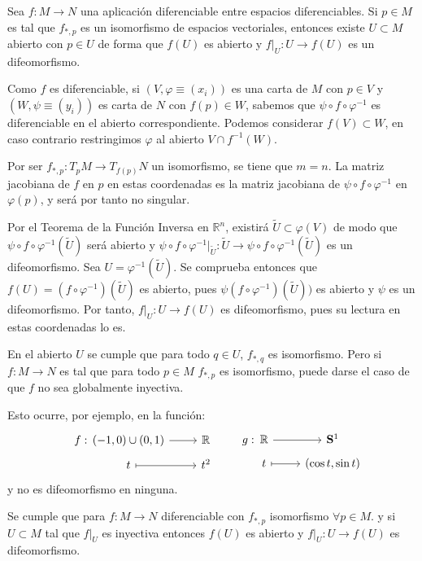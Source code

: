 \begin{teo}
Sea $f: M \to N$ una aplicación diferenciable entre espacios diferenciables. Si $p \in M$ es tal que $f_{*,p}$ es un isomorfismo de espacios vectoriales, entonces existe $U \subset M$ abierto con $p \in U$ de forma que $f(U)$ es abierto y $f|_U:U \to f(U)$ es un difeomorfismo.
\end{teo}
\begin{dem}
Como $f$ es diferenciable, si $(V,\varphi\equiv(x_i))$ es una carta de $M$ con $p \in V$ y $(W,\psi\equiv(y_i))$ es carta de $N$ con $f(p) \in W$, sabemos que $\psi \circ f \circ \varphi^{-1}$ es diferenciable en el abierto correspondiente. Podemos considerar $f(V) \subset W$, en caso contrario restringimos $\varphi$ al abierto $V \cap f^{-1}(W)$.

Por ser $f_{*,p}:T_pM \to T_{f(p)}N$ un isomorfismo, se tiene que $m = n$. La matriz jacobiana de $f$ en $p$ en estas coordenadas es la matriz jacobiana de $\psi \circ f \circ \varphi^{-1}$ en $\varphi(p)$, y será por tanto no singular.

Por el Teorema de la Función Inversa en $\mathbb{R}^n$, existirá $\tilde{U} \subset \varphi(V)$ de modo que $\psi \circ f \circ \varphi^{-1}(\tilde{U})$ será abierto y $\psi \circ f \circ \varphi^{-1}|_{\tilde{U}} : \tilde{U} \to \psi \circ f \circ \varphi^{-1}(\tilde{U})$ es un difeomorfismo. Sea $U = \varphi^{-1}(\tilde{U})$. Se comprueba entonces que $f(U) = (f \circ \varphi^{-1})(\tilde{U})$ es abierto, pues $\psi(f \circ \varphi^{-1})(\tilde{U}))$ es abierto y $\psi$ es un difeomorfismo. Por tanto, $f|_U : U \to f(U)$ es difeomorfismo, pues su lectura en estas coordenadas lo es.
\end{dem} 
\begin{obs}
En el abierto $U$ se cumple que para todo $q \in U$, $f_{*,q}$ es isomorfismo. Pero si $f: M \to N$ es tal que para todo $p \in M$ $f_{*,p}$ es isomorfismo, puede darse el caso de que $f$ no sea globalmente inyectiva.

Esto ocurre, por ejemplo, en la función:
$$\begin{tikzcd}
f:\hspace{-13mm} & (-1,0) \cup (0,1) \rar & \mathbb{R}\\[-5mm]
& t \arrow[mapsto]{r} & t^2
\end{tikzcd}\quad \begin{tikzcd}
g:\hspace{-13mm} & \mathbb{R} \rar & \bold S^1 \\[-5mm]
& t \arrow[mapsto]{r} & (\cos t, \sin t)
\end{tikzcd}$$
y no es difeomorfismo en ninguna. 
\end{obs} 
\begin{obs}
Se cumple que para $f:M \longrightarrow N$ diferenciable con $f_{*,p}$ isomorfismo $\forall p \in M$. y si $U \subset M$ tal que $f|_U$ es inyectiva entonces $f(U)$ es abierto y $f|_U: U \longrightarrow f(U)$ es difeomorfismo. 
\end{obs} 

